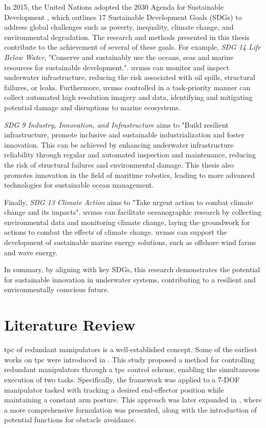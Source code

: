 In 2015, the United Nations adopted the 2030 Agenda for Sustainable Development
\cite{UN2030Agenda}, which outlines 17 Sustainable Development Goals (SDGs) to
address global challenges such as poverty, inequality, climate change, and
environmental degradation. The research and methods presented in this thesis
contribute to the achievement of several of these goals. For example, \emph{SDG 14
Life Below Water}, "Conserve and sustainably use the oceans, seas and marine
resources for sustainable development.". \gls{uvms}s can monitor and inspect underwater
infrastructure, reducing the risk associated with oil spills, structural failures,
or leaks. Furthermore, \gls{uvms}s controlled in a task-priority manner can collect automated
high resolution imagery and data, identifying and mitigating potential
damage and disruptions to marine ecosystems.

\emph{SDG 9 Industry, Innovation, and Infrastructure} aims to "Build resilient
infrastructure, promote inclusive and sustainable industrialization and foster
innovation. This can be achieved by enhancing underwater infrastructure reliability
through regular and automated inspection and maintenance, reducing the risk of
structural failures and environmental damage. This thesis also promotes innovation
in the field of maritime robotics, leading to more advanced technologies for
sustainable ocean management.

Finally, \emph{SDG 13 Climate Action} aims to "Take urgent action to combat climate
change and its impacts". \gls{uvms}s can facilitate oceanographic research by collecting
environmental data and monitoring climate change, laying the groundwork for actions
to combat the effects of climate change. \gls{uvms}s can support the development of
sustainable marine energy solutions, such as offshore wind farms and wave energy.

In summary, by aligning with key SDGs, this research demonstrates the potential
for sustainable innovation in underwater systems, contributing to a resilient 
and environmentally conscious future.

\section{Literature Review}
\label{sec:introduction:literature}

\gls{tpc} of redundant manipulators is a well-established concept.
Some of the earliest works on \gls{tpc} were introduced in 
\cite{hanafusa1981}. This study proposed a method for controlling redundant 
manipulators through a \gls{tpc} control scheme, enabling the simultaneous 
execution of two tasks. Specifically, the framework was applied to a 7-DOF 
manipulator tasked with tracking a desired end-effector position while 
maintaining a constant arm posture. This approach was later expanded in 
\cite{nakamura1987}, where a more comprehensive formulation was presented, 
along with the introduction of potential functions for obstacle avoidance.

